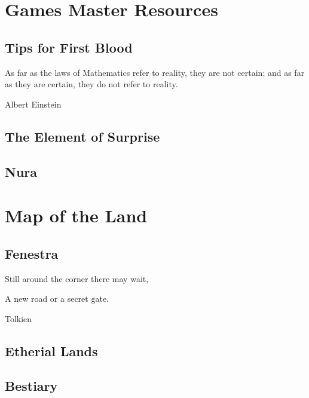\documentclass[a4paper,openany]{report}
\begin{document}

\tableofcontents

\pagebreak




\part{Games Master Resources}


\chapter{Tips for First Blood}
\epigraph{As far as the laws of Mathematics refer to reality, they are not certain; and as far as they are certain, they do not refer to reality.}{Albert Einstein}



\chapter[Random Things]{The Element of Surprise}



\chapter{Nura}



\part{Map of the Land}

\chapter{Fenestra}
\epigraph{Still around the corner there may wait,

A new road or a secret gate.}{Tolkien}





\chapter{Etherial Lands}




\chapter{Bestiary}
\end{document}
